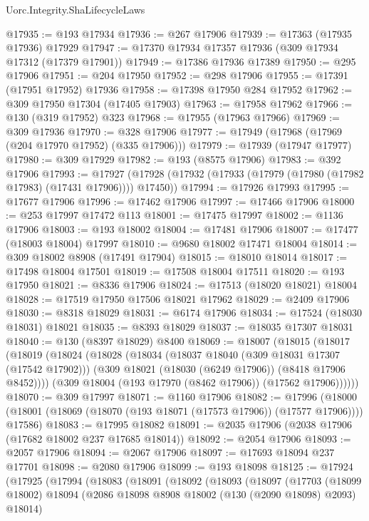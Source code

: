 \begin{lexlean}{Uorc.Integrity.ShaLifecycleLaws}
\begin{coremodule}
@17935 := @193 @17934
@17936 := @267 @17906
@17939 := @17363 (@17935 @17936) @17929
@17947 := @17370 @17934 @17357 @17936 (@309 @17934 @17312 (@17379 @17901))
@17949 := @17386 @17936 @17389
@17950 := @295 @17906
@17951 := @204 @17950
@17952 := @298 @17906
@17955 := @17391 (@17951 @17952) @17936
@17958 := @17398 @17950 @284 @17952
@17962 := @309 @17950 @17304 (@17405 @17903)
@17963 := @17958 @17962
@17966 := @130 (@319 @17952) @323
@17968 := @17955 (@17963 @17966)
@17969 := @309 @17936
@17970 := @328 @17906
@17977 := @17949 (@17968 (@17969 (@204 @17970 @17952) (@335 @17906)))
@17979 := @17939 (@17947 @17977)
@17980 := @309 @17929
@17982 := @193 (@8575 @17906)
@17983 := @392 @17906
@17993 := @17927 (@17928 (@17932 (@17933 (@17979 (@17980 (@17982 @17983) (@17431 @17906)))) @17450))
@17994 := @17926 @17993
@17995 := @17677 @17906
@17996 := @17462 @17906
@17997 := @17466 @17906
@18000 := @253 @17997 @17472 @113
@18001 := @17475 @17997
@18002 := @1136 @17906
@18003 := @193 @18002
@18004 := @17481 @17906
@18007 := @17477 (@18003 @18004) @17997
@18010 := @9680 @18002 @17471 @18004
@18014 := @309 @18002 @8908 (@17491 @17904)
@18015 := @18010 @18014
@18017 := @17498 @18004 @17501
@18019 := @17508 @18004 @17511
@18020 := @193 @17950
@18021 := @8336 @17906
@18024 := @17513 (@18020 @18021) @18004
@18028 := @17519 @17950 @17506 @18021 @17962
@18029 := @2409 @17906
@18030 := @8318 @18029
@18031 := @6174 @17906
@18034 := @17524 (@18030 @18031) @18021
@18035 := @8393 @18029
@18037 := @18035 @17307 @18031
@18040 := @130 (@8397 @18029) @8400
@18069 := @18007
    (@18015
      (@18017
        (@18019
          (@18024
            (@18028
              (@18034
                (@18037 @18040 (@309 @18031 @17307 (@17542 @17902)))
                (@309 @18021 (@18030 (@6249 @17906)) (@8418 @17906 @8452))))
            (@309 @18004 (@193 @17970 (@8462 @17906)) (@17562 @17906))))))
@18070 := @309 @17997
@18071 := @1160 @17906
@18082 := @17996
    (@18000 (@18001 (@18069 (@18070 (@193 @18071 (@17573 @17906)) (@17577 @17906)))) @17586)
@18083 := @17995 @18082
@18091 := @2035 @17906 (@2038 @17906 (@17682 @18002 @237 @17685 @18014))
@18092 := @2054 @17906
@18093 := @2057 @17906
@18094 := @2067 @17906
@18097 := @17693 @18094 @237 @17701
@18098 := @2080 @17906
@18099 := @193 @18098
@18125 := @17924
    (@17925
      (@17994
        (@18083
          (@18091
            (@18092
              (@18093
                (@18097
                  (@17703
                    (@18099 @18002)
                    @18094
                    (@2086 @18098 @8908 @18002 (@130 (@2090 @18098) @2093) @18014)

\end{coremodule}
\end{lexlean}
